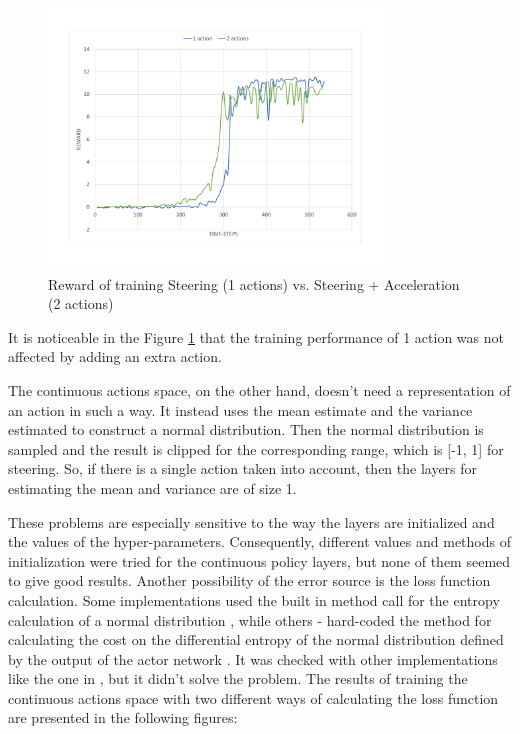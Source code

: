 \begin{figure}[H]
	\centering
	\includegraphics[width=0.8\textwidth]{Figures/2Actions}
	\caption{Reward of training Steering (1 actions) vs. Steering + Acceleration (2 actions)}
	\label{fig:2Actions}
\end{figure}

It is noticeable in the Figure \ref{fig:2Actions} that the training performance of 1 action was not affected by adding an extra action.

The continuous actions space, on the other hand, doesn't need a representation of an action in such a way. It instead uses the mean estimate and the variance estimated to construct a normal distribution. Then the normal distribution is sampled and the result is clipped for the corresponding range, which is [-1, 1] for steering. So, if there is a single action taken into account, then the layers for estimating the mean and variance are of size 1.

These problems are especially sensitive to the way the layers are initialized and the values of the hyper-parameters. Consequently, different values and methods of initialization were tried for the continuous policy layers, but none of them seemed to give good results. Another possibility of the error source is the loss function calculation. Some implementations used the built in method call for the entropy calculation of a normal distribution \cite{A3CImplementation}, while others - hard-coded the method for calculating the cost on the differential entropy of the normal distribution defined by the output of the actor network \cite{DBLP:journals/corr/MnihBMGLHSK16}. It was checked with other implementations like the one in \cite{A3CLoss}, but it didn't solve the problem. The results of training the continuous actions space with two different ways of calculating the loss function are presented in the following figures:

